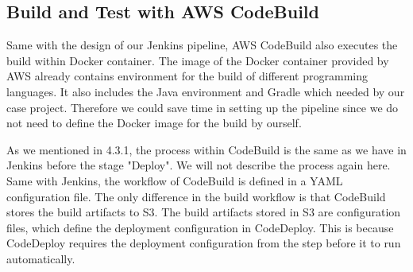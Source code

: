 \subsection{Build and Test with AWS CodeBuild}
Same with the design of our Jenkins pipeline, AWS CodeBuild also executes the build within Docker container. The image of the Docker container provided by AWS already contains environment for the build of different programming languages. It also includes the Java environment and Gradle which needed by our case project. Therefore we could save time in setting up the pipeline since we do not need to define the Docker image for the build by ourself.
\par
As we mentioned in 4.3.1, the process within CodeBuild is the same as we have in Jenkins before the stage "Deploy". We will not describe the process again here. Same with Jenkins, the workflow of CodeBuild is defined in a YAML configuration file. The only difference in the build workflow is that CodeBuild stores the build artifacts to S3. The build artifacts stored in S3 are configuration files, which define the deployment configuration in CodeDeploy. This is because CodeDeploy requires the deployment configuration from the step before it to run automatically.

